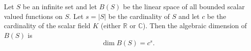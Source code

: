 Let $S$ be an infinite set and let $B(S)$ be the linear space of all bounded scalar valued functions on $S$. Let $s = |S|$ be the cardinality of $S$ and let $c$ be the cardinality of the scalar field $K$ (either $\mathbb{R}$ or $\mathbb{C}$). Then the algebraic dimension of $B(S)$ is
$$
\dim B(S) = c^s.
$$
